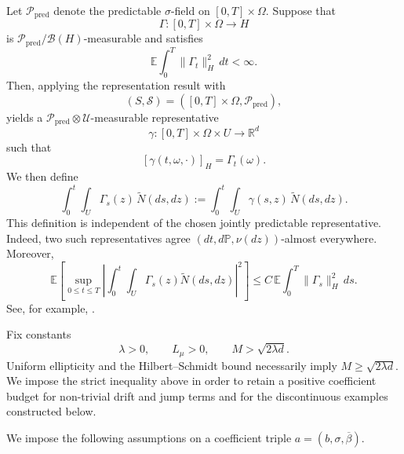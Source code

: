 \documentclass[12pt,oneside, reqno]{amsart}
\numberwithin{equation}{section}
\begin{document}
	Let $\mathcal P_{\mathrm{pred}}$ denote the predictable $\sigma$-field on $[0,T]\times\Omega$. Suppose that
	\[
	\Gamma: [0,T]\times\Omega \longrightarrow H
	\]
	is $\mathcal P_{\mathrm{pred}}/\mathcal B(H)$-measurable and satisfies
	\[
	\mathbb E \int_0^T \|\Gamma_t\|_H^2\,dt < \infty.
	\]
	Then, applying the representation result with
	\[
	(S,\mathcal S) = ([0,T]\times\Omega,\mathcal P_{\mathrm{pred}}),
	\]
	yields a $\mathcal P_{\mathrm{pred}}\otimes\mathcal U$-measurable representative
	\[
	\gamma: [0,T]\times\Omega\times U \longrightarrow \mathbb R^d
	\]
	such that
	\[
	[\gamma(t,\omega,\cdot)]_H = \Gamma_t(\omega).
	\]
	We then define
	\[
	\int_0^t\int_U \Gamma_s(z) \,\widetilde N(ds,dz) := \int_0^t\int_U \gamma(s,z) \,\widetilde N(ds,dz).
	\]
	This definition is independent of the chosen jointly predictable representative. Indeed, two such representatives agree $(dt,d\mathbb P,\nu(dz))$-almost everywhere. Moreover,
	\begin{equation}
		\label{eq:estimate}
		\mathbb E\left[ \sup_{0\leq t\leq T} \left| \int_0^t\int_U \Gamma_s(z) \widetilde N(ds,dz) \right|^2 \right] \leq C\, \mathbb E \int_0^T \|\Gamma_s\|_H^2\,ds.
	\end{equation}
	See, for example, \cite[Chapters~2 and~4]{Applebaum2009}. 
	
	
	
	
	
	
	
	Fix constants
	\[
	\lambda>0,\qquad L_\mu>0,\qquad
	M>\sqrt{2\lambda d}.
	\]
	Uniform ellipticity and the Hilbert--Schmidt bound necessarily imply
	$M\geq\sqrt{2\lambda d}$. We impose the strict inequality above in
	order to retain a positive coefficient budget for non-trivial drift and
	jump terms and for the discontinuous examples constructed below.
	
	
	We impose the following assumptions on a coefficient triple  $a=(b,\sigma,\overline\beta)$.
	
\end{document}
